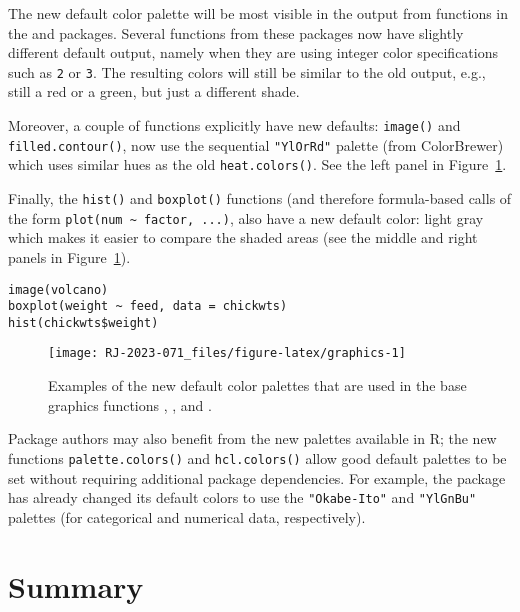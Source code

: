 The new default color palette will be most visible in the output from
functions in the  and  packages.
Several functions from these packages
now have slightly different default output,
namely when they are using integer color specifications such as
\texttt{2} or \texttt{3}.
The resulting colors will still be similar to the old output, e.g.,
still a red or a green, but just a different shade.

Moreover, a couple of functions explicitly have new defaults:
\texttt{image()} and \texttt{filled.contour()}, now use the sequential \texttt{"YlOrRd"} palette
(from ColorBrewer)
which uses similar hues as the old \texttt{heat.colors()}.
See the left panel in Figure~\ref{fig:graphics}.

Finally, the \texttt{hist()} and \texttt{boxplot()} functions (and therefore
formula-based calls of the form \texttt{plot(num\ \textasciitilde{}\ factor,\ ...)}, also have a new default color:
light gray which makes it easier to compare the shaded areas
(see the middle and right panels in Figure~\ref{fig:graphics}).

\begin{verbatim}
image(volcano)
boxplot(weight ~ feed, data = chickwts)
hist(chickwts$weight)
\end{verbatim}

\begin{figure}[ht!]

{\centering \texttt{[image: RJ-2023-071\_files/figure-latex/graphics-1]} 

}

\caption{Examples of the new default color palettes that are used in the base graphics functions , , and .}\label{fig:graphics}
\end{figure}

Package authors may also benefit from the new palettes available
in R; the new functions \texttt{palette.colors()} and \texttt{hcl.colors()}
allow good default palettes to be set without requiring additional
package dependencies. For example, the  package
has already changed its default colors to use the \texttt{"Okabe-Ito"} and
\texttt{"YlGnBu"} palettes (for categorical and numerical data, respectively).

\hypertarget{sec:summary}{%
\section{Summary}\label{sec:summary}}

